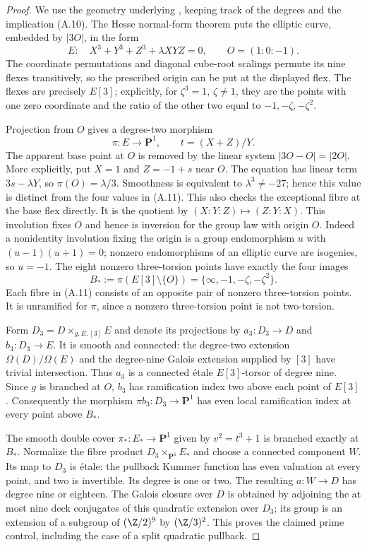 \begin{proof}
We use the geometry underlying
\citet[\S4, especially Lemma 4.3]{A_BogomolovTschinkel2002},
keeping track of the degrees and the implication (A.10).
The Hesse normal-form theorem
\citep[Lemma 2.1, with the characteristic hypothesis in \S2]{A_ArtebaniDolgachev2009}
puts the elliptic curve, embedded by $|3O|$, in the form
\[
 E:\quad X^3+Y^3+Z^3+\lambda XYZ=0,
 \qquad O=(1:0:-1).
\]
The coordinate permutations and diagonal cube-root scalings
permute its nine flexes transitively, so the prescribed origin
can be put at the displayed flex. The flexes are precisely
$E[3]$; explicitly, for $\zeta^3=1$, $\zeta\ne1$, they are
the points with one zero coordinate and the ratio of the other
two equal to $-1,-\zeta,-\zeta^2$.

Projection from $O$ gives a degree-two morphism
\[
 \pi:E\longrightarrow\mathbf P^1,
 \qquad t=(X+Z)/Y.
\]
The apparent base point at $O$ is removed by the linear system
$|3O-O|=|2O|$. More explicitly, put $X=1$ and $Z=-1+s$
near $O$. The equation has linear term $3s-\lambda Y$, so
$\pi(O)=\lambda/3$. Smoothness is equivalent to
$\lambda^3\ne-27$; hence this value is distinct from the
four values in (A.11). This also checks the exceptional fibre
at the base flex directly.
It is the quotient by $(X:Y:Z)\mapsto(Z:Y:X)$. This involution
fixes $O$ and hence is inversion for the group law with origin
$O$. Indeed a nonidentity involution fixing the origin is a
group endomorphism $u$ with $(u-1)(u+1)=0$; nonzero
endomorphisms of an elliptic curve are isogenies, so $u=-1$.
The eight nonzero three-torsion points have exactly the four
images
\[
 B_*:=\pi(E[3]\setminus\{O\})
       =\{\infty,-1,-\zeta,-\zeta^2\}.                         \tag{A.11}
\]
Each fibre in (A.11) consists of an opposite pair of nonzero
three-torsion points. It is unramified for $\pi$, since a
nonzero three-torsion point is not two-torsion.

Form $D_3=D\times_{g,E,[3]}E$ and denote its projections by
$a_3:D_3\to D$ and $b_3:D_3\to E$. It is smooth and
connected: the degree-two extension $\Omega(D)/\Omega(E)$
and the degree-nine Galois extension supplied by $[3]$ have
trivial intersection. Thus $a_3$ is a connected \'etale
$E[3]$-torsor of degree nine. Since $g$ is branched at $O$,
$b_3$ has ramification index two above each point of $E[3]$.
Consequently the morphism $\pi b_3:D_3\to\mathbf P^1$ has
even local ramification index at every point above $B_*$.

The smooth double cover $\pi_*:E_*\to\mathbf P^1$ given by
$v^2=t^3+1$ is branched exactly at $B_*$. Normalize the fibre
product $D_3\times_{\mathbf P^1}E_*$ and choose a connected
component $W$. Its map to $D_3$ is \'etale: the pullback
Kummer function has even valuation at every point, and two
is invertible. Its degree is one or two. The resulting
$a:W\to D$ has degree nine or eighteen. The Galois closure
over $D$ is obtained by adjoining the at most nine deck
conjugates of this quadratic extension over $D_3$; its group
is an extension of a subgroup of $(\Z/2)^9$ by $(\Z/3)^2$.
This proves the claimed prime control, including the case of
a split quadratic pullback.


\end{proof}
